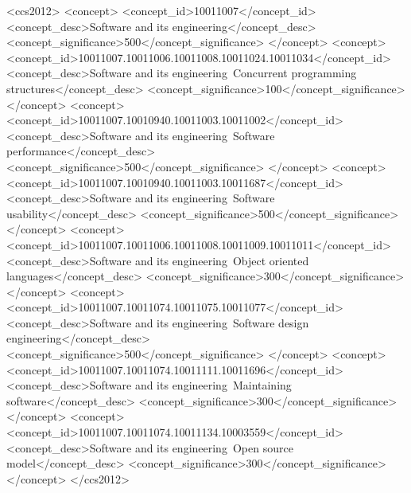 \documentclass[acmtog, authorversion]{acmart}
\begin{document}
\begin{CCSXML}
\begin{CCSXML}
<ccs2012>
<concept>
<concept_id>10011007</concept_id>
<concept_desc>Software and its engineering</concept_desc>
<concept_significance>500</concept_significance>
</concept>
<concept>
<concept_id>10011007.10011006.10011008.10011024.10011034</concept_id>
<concept_desc>Software and its engineering~Concurrent programming structures</concept_desc>
<concept_significance>100</concept_significance>
</concept>
<concept>
<concept_id>10011007.10010940.10011003.10011002</concept_id>
<concept_desc>Software and its engineering~Software performance</concept_desc>
<concept_significance>500</concept_significance>
</concept>
<concept>
<concept_id>10011007.10010940.10011003.10011687</concept_id>
<concept_desc>Software and its engineering~Software usability</concept_desc>
<concept_significance>500</concept_significance>
</concept>
<concept>
<concept_id>10011007.10011006.10011008.10011009.10011011</concept_id>
<concept_desc>Software and its engineering~Object oriented languages</concept_desc>
<concept_significance>300</concept_significance>
</concept>
<concept>
<concept_id>10011007.10011074.10011075.10011077</concept_id>
<concept_desc>Software and its engineering~Software design engineering</concept_desc>
<concept_significance>500</concept_significance>
</concept>
<concept>
<concept_id>10011007.10011074.10011111.10011696</concept_id>
<concept_desc>Software and its engineering~Maintaining software</concept_desc>
<concept_significance>300</concept_significance>
</concept>
<concept>
<concept_id>10011007.10011074.10011134.10003559</concept_id>
<concept_desc>Software and its engineering~Open source model</concept_desc>
<concept_significance>300</concept_significance>
</concept>
</ccs2012>
\end{CCSXML}

\end{CCSXML}
\end{document}
